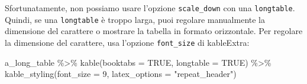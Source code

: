 \documentclass[a4paper, 11pt, nobind]{templates/ociamthesis}
\newenvironment{Shaded}{\begin{snugshade}}{\end{snugshade}}
\newcommand{\AttributeTok}[1]{\textcolor[rgb]{0.77,0.63,0.00}{#1}}
\newcommand{\ConstantTok}[1]{\textcolor[rgb]{0.00,0.00,0.00}{#1}}
\newcommand{\DecValTok}[1]{\textcolor[rgb]{0.00,0.00,0.81}{#1}}
\newcommand{\FunctionTok}[1]{\textcolor[rgb]{0.00,0.00,0.00}{#1}}
\newcommand{\NormalTok}[1]{#1}
\newcommand{\SpecialCharTok}[1]{\textcolor[rgb]{0.00,0.00,0.00}{#1}}
\newcommand{\StringTok}[1]{\textcolor[rgb]{0.31,0.60,0.02}{#1}}
\renewenvironment{Shaded}
{
  \vspace{10pt}%
  \begin{snugshade}%
}{%
  \end{snugshade}%
  \vspace{8pt}%
}
\begin{document}
Sfortunatamente, non possiamo usare l'opzione \texttt{scale\_down} con una \texttt{longtable}.
Quindi, se una \texttt{longtable} è troppo larga, puoi regolare manualmente la dimensione del carattere o mostrare la tabella in formato orizzontale.
Per regolare la dimensione del carattere, usa l'opzione \texttt{font\_size} di kableExtra:

\begin{Shaded}
\begin{Highlighting}[]
\NormalTok{a\_long\_table }\SpecialCharTok{\%\textgreater{}\%} 
  \FunctionTok{kable}\NormalTok{(}\AttributeTok{booktabs =} \ConstantTok{TRUE}\NormalTok{, }\AttributeTok{longtable =} \ConstantTok{TRUE}\NormalTok{) }\SpecialCharTok{\%\textgreater{}\%} 
  \FunctionTok{kable\_styling}\NormalTok{(}\AttributeTok{font\_size =} \DecValTok{9}\NormalTok{, }\AttributeTok{latex\_options =} \StringTok{"repeat\_header"}\NormalTok{)}
\end{Highlighting}
\end{Shaded}

\begingroup\fontsize{9}{11}\selectfont
\end{document}
